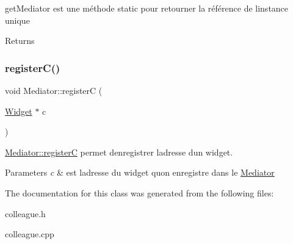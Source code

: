 get\+Mediator est une méthode static pour retourner la référence de l\textquotesingle{}instance unique 

\begin{DoxyReturn}{Returns}

\end{DoxyReturn}
\mbox{\label{classMediator_aeb991fe5844fcb6ccd40086369373e37}} 
\subsubsection{\texorpdfstring{register\+C()}{registerC()}}
{\footnotesize\ttfamily void Mediator\+::registerC (\begin{DoxyParamCaption}\item[{\hyperlink{classWidget}{Widget} $\ast$}]{c }\end{DoxyParamCaption})\hspace{0.3cm}{\ttfamily [virtual]}}



\hyperlink{classMediator_aeb991fe5844fcb6ccd40086369373e37}{Mediator\+::registerC} permet d\textquotesingle{}enregistrer l\textquotesingle{}adresse d\textquotesingle{}un widget. 


\begin{DoxyParams}{Parameters}
{\em c} & est l\textquotesingle{}adresse du widget qu\textquotesingle{}on enregistre dans le \hyperlink{classMediator}{Mediator} \\
\hline
\end{DoxyParams}


The documentation for this class was generated from the following files\+:\begin{DoxyCompactItemize}
\item 
colleague.\+h\item 
colleague.\+cpp\end{DoxyCompactItemize}
